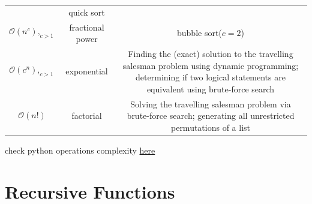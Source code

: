 \documentclass[11pt]{article}
\begin{document}
\begin{longtable}[]{@{}ccc@{}}
\begin{minipage}[t]{0.30\columnwidth}
\end{minipage} & \begin{minipage}[t]{0.30\columnwidth}\centering
quick sort\strut
\end{minipage}\tabularnewline
\begin{minipage}[t]{0.30\columnwidth}\centering
\[\mathcal{O}\left(n^{c}\right), _{c >1}\]\strut
\end{minipage} & \begin{minipage}[t]{0.30\columnwidth}\centering
fractional power\strut
\end{minipage} & \begin{minipage}[t]{0.30\columnwidth}\centering
bubble sort(\(c=2\))\strut
\end{minipage}\tabularnewline
\begin{minipage}[t]{0.30\columnwidth}\centering
\[\mathcal{O}\left( c^{n}\right), _{c >1}\]\strut
\end{minipage} & \begin{minipage}[t]{0.30\columnwidth}\centering
exponential\strut
\end{minipage} & \begin{minipage}[t]{0.30\columnwidth}\centering
Finding the (exact) solution to the travelling salesman problem using
dynamic programming; determining if two logical statements are
equivalent using brute-force search\strut
\end{minipage}\tabularnewline
\begin{minipage}[t]{0.30\columnwidth}\centering
\[\mathcal{O}( n!)\]\strut
\end{minipage} & \begin{minipage}[t]{0.30\columnwidth}\centering
factorial\strut
\end{minipage} & \begin{minipage}[t]{0.30\columnwidth}\centering
Solving the travelling salesman problem via brute-force search;
generating all unrestricted permutations of a list\strut
\end{minipage}\tabularnewline
\bottomrule
\end{longtable}

check python operations complexity
\href{https://wiki.python.org/moin/TimeComplexity}{here}

    \hypertarget{recursive-functions}{%
\section{Recursive Functions}\label{recursive-functions}}
\end{document}
